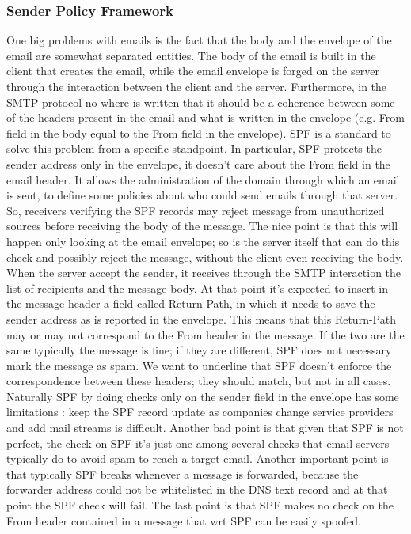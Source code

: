 \subsubsection{Sender Policy Framework}
One big problems with emails is the fact that the body and the envelope of the email are somewhat separated entities. The body of the email is built in the client that creates the email, while the email envelope is forged on the server through the interaction between the client and the server. Furthermore, in the SMTP protocol no where is written that it should be a coherence between some of the headers present in the email and what is written in the envelope (e.g. From field in the body equal to the From field in the envelope). SPF is a standard to solve this problem from a specific standpoint. In particular, SPF protects the sender address only in the envelope, it doesn't care about the From field in the email header. It allows the administration of the domain through which an email is sent, to define some policies about who could send emails through that server. So, receivers verifying the SPF records may reject message from unauthorized sources before receiving the body of the message. The nice point is that this will happen only looking at the email envelope; so is the server itself that can do this check and possibly reject the message, without the client even receiving the body. When the server accept the sender, it receives through the SMTP interaction the list of recipients and the message body. At that point it's expected to insert in the message header a field called Return-Path, in which it needs to save the sender address as is reported in the envelope. This means that this Return-Path may or may not correspond to the From header in the message. If the two are the same typically the message is fine; if they are different, SPF does not necessary mark the message as spam. We want to underline that SPF doesn't enforce the correspondence between these headers; they should match, but not in all cases. Naturally SPF by doing checks only on the sender field in the envelope has some limitations : keep the SPF record update as companies change service providers and add mail streams is difficult. Another bad point is that given that SPF is not perfect, the check on SPF it's just one among several checks that email servers typically do to avoid spam to reach a target email. Another important point is that typically SPF breaks whenever a message is forwarded, because the forwarder address could not be whitelisted in the DNS text record and at that point the SPF check will fail. The last point is that SPF makes no check on the From header contained in a message that wrt SPF can be easily spoofed.

